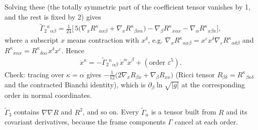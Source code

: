 \documentclass[letterpaper,10pt,english]{jupyterBook}
\begin{document}
\sphinxAtStartPar
Solving these (the totally symmetric part of the coefficient tensor vanishes by 1, and the rest is fixed by 2) gives
\begin{equation*}
\begin{split}
\tilde\Gamma_2{}^\kappa{}_{\alpha\beta}=\tfrac1{24}\Big[\,5\big(\nabla_x R^\kappa{}_{\alpha x\beta}+\nabla_x R^\kappa{}_{\beta x\alpha}\big)-\nabla_\beta R^\kappa{}_{x\alpha x}-\nabla_\alpha R^\kappa{}_{x\beta x}\Big],
\end{split}
\end{equation*}
\sphinxAtStartPar
where a subscript \(x\) means contraction with \(x^\delta\), e.g. \(\nabla_xR^\kappa{}_{\alpha x\beta}=x^\varepsilon x^\delta\nabla_\varepsilon R^\kappa{}_{\alpha\delta\beta}\) and \(R^\kappa{}_{x\alpha x}=R^\kappa{}_{\delta\alpha\varepsilon}x^\delta x^\varepsilon\). Hence
\begin{equation*}
\begin{split}
\ddot x^\kappa=-\tilde\Gamma_2{}^\kappa{}_{\alpha\beta}\,\dot x^\alpha\dot x^\beta+(\text{order }\varepsilon^5).
\end{split}
\end{equation*}
\sphinxAtStartPar
Check: tracing over \(\kappa=\alpha\) gives \(-\tfrac1{12}\big(2\nabla_xR_{\beta x}+\nabla_\beta R_{xx}\big)\) (Ricci tensor \(R_{\beta\delta}=R^\kappa{}_{\beta\kappa\delta}\) and the contracted Bianchi identity), which is \(\partial_\beta\ln\sqrt{|g|}\) at the corresponding order in normal coordinates.

\sphinxAtStartPar
{} \(\tilde\Gamma_3\) contains \(\nabla\nabla R\) and \(R^2\), and so on. Every \(\tilde\Gamma_n\) is a tensor built from \(R\) and its covariant derivatives, because the frame components \(\Gamma\) cancel at each order.
\end{document}
